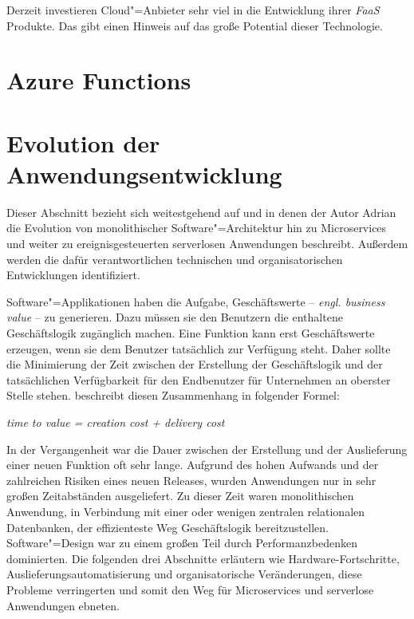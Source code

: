 Derzeit investieren Cloud"=Anbieter sehr viel in die Entwicklung ihrer \textit{FaaS} Produkte. Das gibt einen Hinweis auf das große Potential dieser Technologie.

\section{Azure Functions}


\section{Evolution der Anwendungsentwicklung}

Dieser Abschnitt bezieht sich weitestgehend auf \cite{Cock16EvoFunc} und \cite{Cock17ShrinkingMS} in denen der Autor Adrian \citeauthor{Cock16EvoFunc} die Evolution von monolithischer Software"=Architektur hin zu Microservices und weiter zu ereignisgesteuerten serverlosen Anwendungen beschreibt. Außerdem werden die dafür verantwortlichen technischen und organisatorischen Entwicklungen identifiziert.

Software"=Applikationen haben die Aufgabe, Geschäftswerte -- \textit{engl. business value} -- zu generieren. Dazu müssen sie den Benutzern die enthaltene Geschäftslogik zugänglich machen. Eine Funktion kann erst Geschäftswerte erzeugen, wenn sie dem Benutzer tatsächlich zur Verfügung steht. Daher sollte die Minimierung der Zeit zwischen der Erstellung der Geschäftslogik und der tatsächlichen Verfügbarkeit für den Endbenutzer für Unternehmen an oberster Stelle stehen. \citeauthor{Cock16EvoFunc} beschreibt diesen Zusammenhang in folgender Formel:

\begin{center}
\textit{time to value = creation cost + delivery cost}
\end{center}

In der Vergangenheit war die Dauer zwischen der Erstellung und der Auslieferung einer neuen Funktion oft sehr lange. Aufgrund des hohen Aufwands und der zahlreichen Risiken eines neuen Releases, wurden Anwendungen nur in sehr großen Zeitabständen ausgeliefert. Zu dieser Zeit waren monolithischen Anwendung, in Verbindung mit einer oder wenigen zentralen relationalen Datenbanken, der effizienteste Weg Geschäftslogik bereitzustellen. Software"=Design war zu einem großen Teil durch Performanzbedenken dominierten. Die folgenden drei Abschnitte erläutern wie Hardware-Fortschritte, Auslieferungsautomatisierung und organisatorische Veränderungen, diese Probleme verringerten und somit den Weg für Microservices und serverlose Anwendungen ebneten.

